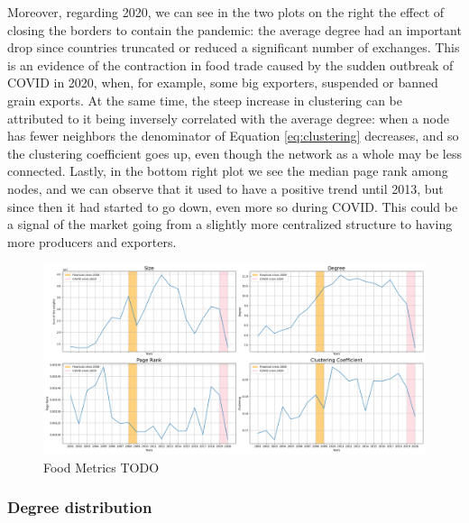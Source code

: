 Moreover, regarding 2020, we can see in the two plots on the right the effect of closing the borders to contain the pandemic: the average degree had an important drop since countries truncated or reduced a significant number of exchanges. This is an evidence of the contraction in food trade caused by the sudden outbreak of COVID in 2020, when, for example, some big exporters, suspended or banned grain exports.
At the same time, the steep increase in clustering can be attributed to it being inversely correlated with the average degree: when a node has fewer neighbors the denominator of Equation \ref{eq:clustering} decreases, and so the clustering coefficient goes up, even though the network as a whole may be less connected.
Lastly, in the bottom right plot we see the median page rank among nodes, and we can observe that it used to have a positive trend until 2013, but since then it had started to go down, even more so during COVID. This could be a signal of the market going from a slightly more centralized structure to having more producers and exporters.

\begin{figure}[H]
    \centering
    \includegraphics[width=\textwidth]{pics/full_p10_metric_ts.png}
    \caption{Food Metrics TODO}
    \label{fig:foodmetrics}
\end{figure}

\subsubsection*{Degree distribution}

